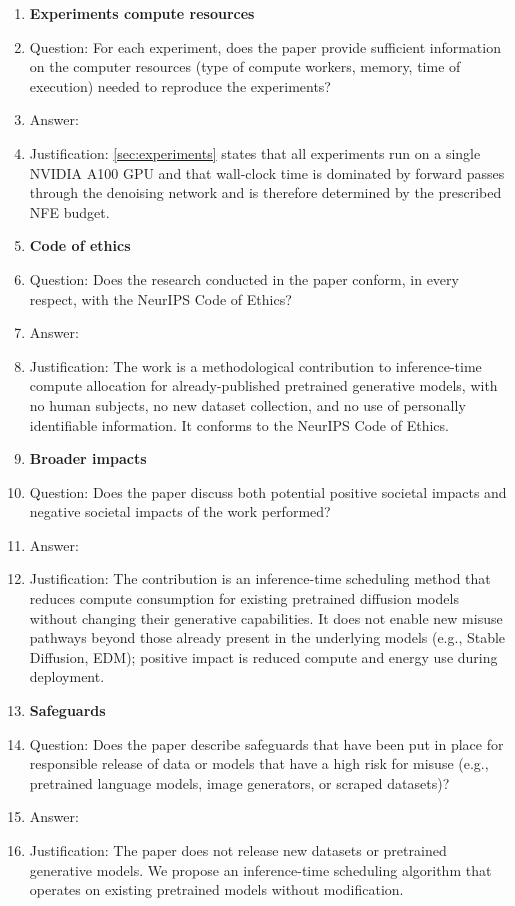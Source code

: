 \begin{enumerate}
\item {\bf Experiments compute resources}
\item[] Question: For each experiment, does the paper provide sufficient information on the computer resources (type of compute workers, memory, time of execution) needed to reproduce the experiments?
\item[] Answer: \answerYes{}
\item[] Justification: \cref{sec:experiments} states that all experiments run on a single NVIDIA A100 GPU and that wall-clock time is dominated by forward passes through the denoising network and is therefore determined by the prescribed NFE budget.

\item {\bf Code of ethics}
\item[] Question: Does the research conducted in the paper conform, in every respect, with the NeurIPS Code of Ethics?
\item[] Answer: \answerYes{}
\item[] Justification: The work is a methodological contribution to inference-time compute allocation for already-published pretrained generative models, with no human subjects, no new dataset collection, and no use of personally identifiable information. It conforms to the NeurIPS Code of Ethics.

\item {\bf Broader impacts}
\item[] Question: Does the paper discuss both potential positive societal impacts and negative societal impacts of the work performed?
\item[] Answer: \answerNA{}
\item[] Justification: The contribution is an inference-time scheduling method that reduces compute consumption for existing pretrained diffusion models without changing their generative capabilities. It does not enable new misuse pathways beyond those already present in the underlying models (e.g., Stable Diffusion, EDM); positive impact is reduced compute and energy use during deployment.

\item {\bf Safeguards}
\item[] Question: Does the paper describe safeguards that have been put in place for responsible release of data or models that have a high risk for misuse (e.g., pretrained language models, image generators, or scraped datasets)?
\item[] Answer: \answerNA{}
\item[] Justification: The paper does not release new datasets or pretrained generative models. We propose an inference-time scheduling algorithm that operates on existing pretrained models without modification.


\end{enumerate}
